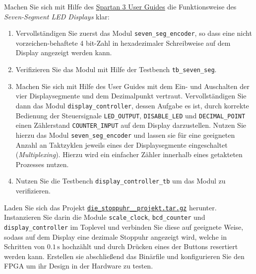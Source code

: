 \documentclass[12pt]{article}
\begin{document}


Machen Sie sich mit Hilfe des \textcolor{blue}{\href{https://www.xilinx.com/support/documentation/boards_and_kits/ug130.pdf}{Spartan 3 User Guides}} die Funktionsweise des \textit{Seven-Segment LED Displays} klar:


\begin{enumerate}[label=\alph*.)]


\item Vervollständigen Sie zuerst das Modul \texttt{seven\_seg\_encoder}, so dass eine nicht vorzeichen-behaftete 4 bit-Zahl in hexadezimaler Schreibweise auf dem Display angezeigt werden kann.


\item Verifizieren Sie das Modul mit Hilfe der Testbench \texttt{tb\_seven\_seg}.


\item Machen Sie sich mit Hilfe des User Guides mit dem Ein- und Auschalten der vier Displaysegmente und dem Dezimalpunkt vertraut.
Vervollständigen Sie dann das Modul \texttt{display\_controller}, dessen Aufgabe es ist, durch korrekte Bedienung der Steuersignale \texttt{LED\_OUTPUT}, \texttt{DISABLE\_LED} und \texttt{DECIMAL\_POINT} einen Zählerstand \texttt{COUNTER\_INPUT} auf dem Display darzustellen.
Nutzen Sie hierzu das Modul \texttt{seven\_seg\_encoder} und lassen sie für eine geeigneten Anzahl an Taktzyklen jeweils
eines der Displaysegmente eingeschaltet (\textit{Multiplexing}).
Hierzu wird ein einfacher Zähler innerhalb eines getakteten Prozesses nutzen.


\item Nutzen Sie die Testbench \texttt{display\_controller\_tb} um das Modul zu verifizieren.


\end{enumerate}







Laden Sie sich das Projekt \textcolor{blue}{\href{https://ilias.uni-freiburg.de/goto.php?target=file_2292377_download&client_id=unifreiburg}{\texttt{die\_stoppuhr\_\_projekt.tar.gz}}} herunter. Instanzieren Sie darin die Module \texttt{scale\_clock}, \texttt{bcd\_counter} und \texttt{display\_controller} im Toplevel und verbinden Sie diese auf geeignete Weise,
sodass auf dem Display eine dezimale Stoppuhr angezeigt wird, welche in Schritten von $0.1\,\mathrm{s}$ hochzählt und durch Drücken eines der Buttons resertiert werden kann.
Erstellen sie abschließend das Binärfile und konfigurieren Sie den FPGA um ihr Design in der Hardware zu testen.
\end{document}
